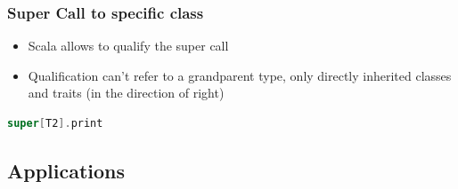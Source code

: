 \hypertarget{super-call-to-specific-class}{%
\subsubsection{Super Call to specific
class}\label{super-call-to-specific-class}}

\begin{itemize}
\tightlist
\item
  Scala allows to qualify the super call
\item
  Qualification can't refer to a grandparent type, only directly
  inherited classes and traits (in the direction of right)
\end{itemize}

\begin{lstlisting}[language=scala,mathescape=false]
super[T2].print
\end{lstlisting}

\clearpage
\hypertarget{applications}{%
\subsection{Applications}\label{applications}}

